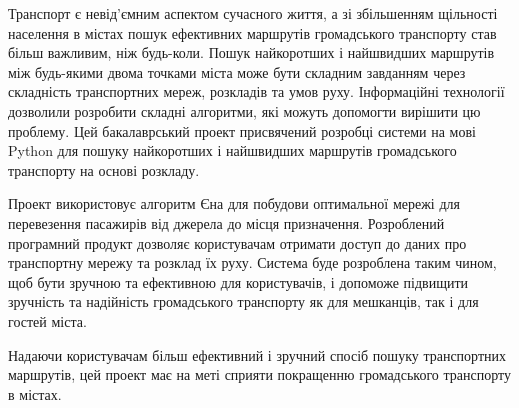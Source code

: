 \intro

Транспорт є невід'ємним аспектом сучасного життя, а зі збільшенням щільності
населення в містах пошук ефективних маршрутів громадського транспорту став
більш важливим, ніж будь-коли. Пошук найкоротших і найшвидших маршрутів між
будь-якими двома точками міста може бути складним завданням через складність
транспортних мереж, розкладів та умов руху. Інформаційні технології дозволили
розробити складні алгоритми, які можуть допомогти вирішити цю проблему. Цей
бакалаврський проект присвячений розробці системи на мові Python для пошуку
найкоротших і найшвидших маршрутів громадського транспорту на основі розкладу.

Проект використовує алгоритм Єна для побудови оптимальної мережі для
перевезення пасажирів від джерела до місця призначення. Розроблений програмний
продукт дозволяє користувачам отримати доступ до даних про транспортну мережу
та розклад їх руху. Система буде розроблена таким чином, щоб бути зручною та
ефективною для користувачів, і допоможе підвищити зручність та надійність
громадського транспорту як для мешканців, так і для гостей міста.

Надаючи користувачам більш ефективний і зручний спосіб пошуку транспортних
маршрутів, цей проект має на меті сприяти покращенню громадського транспорту в
містах.
